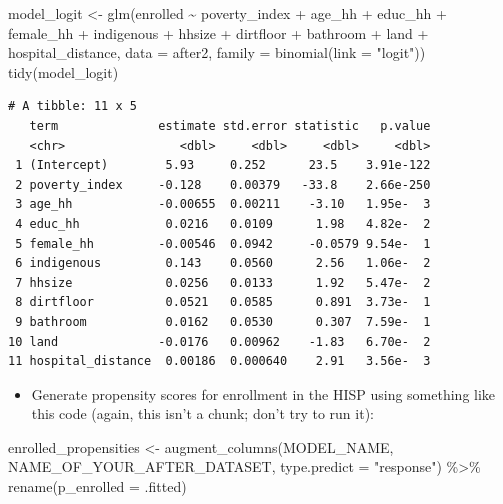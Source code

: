 \documentclass[
  letterpaper,
  DIV=11,
  numbers=noendperiod]{scrartcl}
\newenvironment{Shaded}{\begin{snugshade}}{\end{snugshade}}
\newcommand{\AttributeTok}[1]{\textcolor[rgb]{0.40,0.45,0.13}{#1}}
\newcommand{\FunctionTok}[1]{\textcolor[rgb]{0.28,0.35,0.67}{#1}}
\newcommand{\NormalTok}[1]{\textcolor[rgb]{0.00,0.23,0.31}{#1}}
\newcommand{\OtherTok}[1]{\textcolor[rgb]{0.00,0.23,0.31}{#1}}
\newcommand{\SpecialCharTok}[1]{\textcolor[rgb]{0.37,0.37,0.37}{#1}}
\newcommand{\StringTok}[1]{\textcolor[rgb]{0.13,0.47,0.30}{#1}}
\providecommand{\tightlist}{%
  \setlength{\itemsep}{0pt}\setlength{\parskip}{0pt}}\usepackage{longtable,booktabs,array}
\begin{document}
\begin{Shaded}
\begin{Highlighting}[numbers=left,,]
\NormalTok{model\_logit }\OtherTok{\textless{}{-}} \FunctionTok{glm}\NormalTok{(enrolled }\SpecialCharTok{\textasciitilde{}}\NormalTok{ poverty\_index }\SpecialCharTok{+}\NormalTok{ age\_hh }\SpecialCharTok{+}\NormalTok{ educ\_hh }\SpecialCharTok{+}\NormalTok{ female\_hh }\SpecialCharTok{+} 
\NormalTok{                     indigenous }\SpecialCharTok{+}\NormalTok{ hhsize }\SpecialCharTok{+}\NormalTok{ dirtfloor }\SpecialCharTok{+}\NormalTok{ bathroom }\SpecialCharTok{+}\NormalTok{ land }\SpecialCharTok{+} 
\NormalTok{                     hospital\_distance,}
                   \AttributeTok{data =}\NormalTok{ after2,}
                   \AttributeTok{family =} \FunctionTok{binomial}\NormalTok{(}\AttributeTok{link =} \StringTok{"logit"}\NormalTok{))}
\FunctionTok{tidy}\NormalTok{(model\_logit)}
\end{Highlighting}
\end{Shaded}

\begin{verbatim}
# A tibble: 11 x 5
   term              estimate std.error statistic   p.value
   <chr>                <dbl>     <dbl>     <dbl>     <dbl>
 1 (Intercept)        5.93     0.252      23.5    3.91e-122
 2 poverty_index     -0.128    0.00379   -33.8    2.66e-250
 3 age_hh            -0.00655  0.00211    -3.10   1.95e-  3
 4 educ_hh            0.0216   0.0109      1.98   4.82e-  2
 5 female_hh         -0.00546  0.0942     -0.0579 9.54e-  1
 6 indigenous         0.143    0.0560      2.56   1.06e-  2
 7 hhsize             0.0256   0.0133      1.92   5.47e-  2
 8 dirtfloor          0.0521   0.0585      0.891  3.73e-  1
 9 bathroom           0.0162   0.0530      0.307  7.59e-  1
10 land              -0.0176   0.00962    -1.83   6.70e-  2
11 hospital_distance  0.00186  0.000640    2.91   3.56e-  3
\end{verbatim}

\begin{itemize}
\tightlist
\item
  Generate propensity scores for enrollment in the HISP using something
  like this code (again, this isn't a chunk; don't try to run it):
\end{itemize}

\begin{Shaded}
\begin{Highlighting}[numbers=left,,]
\NormalTok{enrolled\_propensities }\OtherTok{\textless{}{-}} \FunctionTok{augment\_columns}\NormalTok{(MODEL\_NAME, NAME\_OF\_YOUR\_AFTER\_DATASET, }
                                         \AttributeTok{type.predict =} \StringTok{"response"}\NormalTok{) }\SpecialCharTok{\%\textgreater{}\%} 
  \FunctionTok{rename}\NormalTok{(}\AttributeTok{p\_enrolled =}\NormalTok{ .fitted)                                         }
\end{Highlighting}
\end{Shaded}
\end{document}
